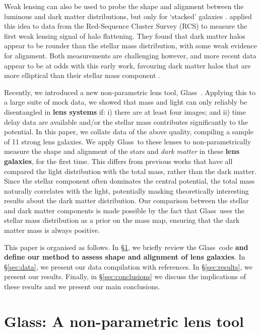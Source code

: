 \documentclass[useAMS,usenatbib]{mn2e}
\def\Glass{{\sc Glass}}
\newcommand{\cb}[1]{{\color{red} \textbf{#1}}}
\begin{document}
Weak lensing can also be used to probe the shape and alignment between the luminous and dark matter distributions, but only for `stacked' galaxies \citep{2000astro.ph..6281B,2000ApJ...538L.113N}. \citet{2004ApJ...606...67H} applied this idea to data from the Red-Sequence Cluster Survey (RCS) to measure the first weak lensing signal of halo flattening. They found that dark matter halos appear to be rounder than the stellar mass distribution, with some weak evidence for alignment. Both measurements are challenging however, and more recent data appear to be at odds with this early work, favouring dark matter halos that are more elliptical than their stellar mass component \citep{2006MNRAS.370.1008M,2007ApJ...669...21P,2012A&A...545A..71V}.

Recently, we introduced a new non-parametric lens tool, \Glass\ \citep{2014arXiv1401.7990C}. Applying this to a large suite of mock data, we showed that mass and light can only reliably be disentangled in \cb{lens systems} if: i) there are at least four images; and ii) time delay data are available and/or the stellar mass contributes significantly to the potential. In this paper, we collate data of the above quality, compiling a sample of 11 strong lens galaxies. We apply \Glass\ to these lenses to non-parametrically measure the shape and alignment of the stars and {\it dark matter} in these \cb{lens galaxies}, for the first time. This differs from previous works that have all compared the light distribution with the total mass, rather than the dark matter. Since the stellar component often dominates the central potential, the total mass naturally correlates with the light, potentially masking theoretically interesting results about the dark matter distribution. Our comparison between the stellar and dark matter components is made possible by the fact that \Glass\ uses the stellar mass distribution as a prior on the mass map, ensuring that the dark matter mass is always positive.

This paper is organised as follows. In \S\ref{sec:glass}, we briefly review the \Glass\ code \cb{and define our method to assess shape and alignment of lens galaxies}. In \S\ref{sec:data}, we present our data compilation with references. In \S\ref{sec:results}, we present our results. Finally, in \S\ref{sec:conclusions} we discuss the implications of these results and we present our main conclusions.


\section{\Glass: A non-parametric lens tool}\label{sec:glass}
\end{document}
